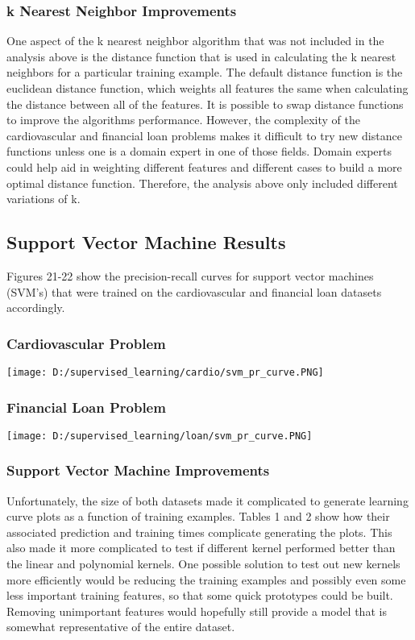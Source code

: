 \documentclass[10pt,journal,compsoc]{IEEEtran}
\begin{document}
\subsubsection{k Nearest Neighbor Improvements}
One aspect of the k nearest neighbor algorithm that was not included in the analysis above is the distance function that is used in calculating the k nearest neighbors for a particular training example. The default distance function is the euclidean distance function, which weights all features the same when calculating the distance between all of the features. It is possible to swap distance functions to improve the algorithms performance. However, the complexity of the cardiovascular and financial loan problems makes it difficult to try new distance functions unless one is a domain expert in one of those fields. Domain experts could help aid in weighting different features and different cases to build a more optimal distance function. Therefore, the analysis above only included different variations of k.
\subsection{Support Vector Machine Results}
Figures 21-22 show the precision-recall curves for support vector machines (SVM's) that were trained on the cardiovascular and financial loan datasets accordingly.
\subsubsection{Cardiovascular Problem}
\begin{center}
	\texttt{[image: D:/supervised\_learning/cardio/svm\_pr\_curve.PNG]}
\end{center}
\subsubsection{Financial Loan Problem}
\begin{center}
	\texttt{[image: D:/supervised\_learning/loan/svm\_pr\_curve.PNG]}
\end{center}

\subsubsection{Support Vector Machine Improvements}
Unfortunately, the size of both datasets made it complicated to generate learning curve plots as a function of training examples. Tables 1 and 2 show how their associated prediction and training times complicate generating the plots. This also made it more complicated to test if different kernel performed better than the linear and polynomial kernels. One possible solution to test out new kernels more efficiently would be reducing the training examples and possibly even some less important training features, so that some quick prototypes could be built. Removing unimportant features would hopefully still provide a model that is somewhat representative of the entire dataset.
\end{document}
